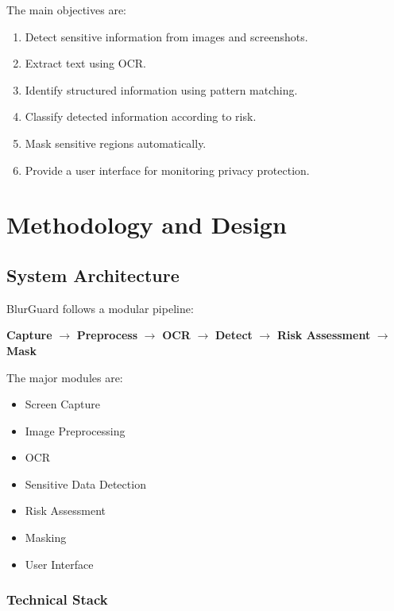 \documentclass[12pt,a4paper]{tietreport}
\begin{document}
The main objectives are:

\begin{enumerate}
    \item Detect sensitive information from images and screenshots.
    \item Extract text using OCR.
    \item Identify structured information using pattern matching.
    \item Classify detected information according to risk.
    \item Mask sensitive regions automatically.
    \item Provide a user interface for monitoring privacy protection.
\end{enumerate}


\chapter{Methodology and Design}

\section{System Architecture}

BlurGuard follows a modular pipeline:

\begin{center}
\textbf{Capture}
$\rightarrow$
\textbf{Preprocess}
$\rightarrow$
\textbf{OCR}
$\rightarrow$
\textbf{Detect}
$\rightarrow$
\textbf{Risk Assessment}
$\rightarrow$
\textbf{Mask}
\end{center}

The major modules are:

\begin{itemize}
    \item Screen Capture
    \item Image Preprocessing
    \item OCR
    \item Sensitive Data Detection
    \item Risk Assessment
    \item Masking
    \item User Interface
\end{itemize}

\subsection{Technical Stack}
\end{document}
